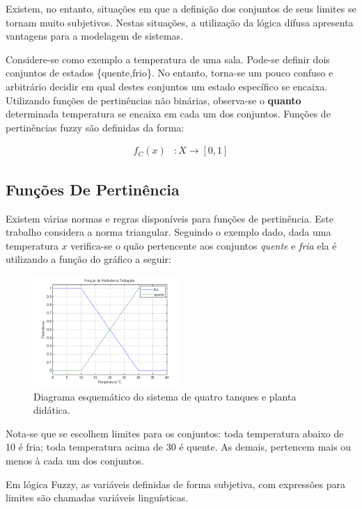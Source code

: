 Existem, no entanto, situações em que a definição dos conjuntos de seus limites se tornam muito subjetivos. Nestas situações, a utilização da lógica difusa apresenta vantagens para a modelagem de sistemas. 

Considere-se como exemplo a temperatura de uma sala. Pode-se definir dois conjuntos de estados \{quente,frio\}. No entanto, torna-se um pouco confuso e arbitrário decidir em qual destes conjuntos um estado específico se encaixa. Utilizando funções de pertinências não binárias, observa-se o \textbf{quanto} determinada temperatura se encaixa em cada um dos conjuntos. Funções de pertinências fuzzy são definidas da forma:

\begin{align*}
	f_{C}(x)&:X \rightarrow [0,1]
\end{align*}

\subsection{Funções De Pertinência}
Existem várias normas e regras disponíveis para funções de pertinência. Este trabalho considera a norma triangular. Seguindo o exemplo dado, dada uma temperatura $x$ verifica-se o quão pertencente aos conjuntos \textit{quente} e \textit{fria} ela é utilizando a função do gráfico a seguir:

\begin{figure}[H]
	\includegraphics[width=0.5\textwidth]{img/pertinencia.png}
	\caption{Diagrama esquemático do sistema de quatro tanques e planta didática.}
	\label{figPertinencia}
\end{figure}

Nota-se que se escolhem limites para os conjuntos: toda temperatura abaixo de 10 é fria; toda temperatura acima de 30 é quente. As demais, pertencem mais ou menos à cada um dos conjuntos.

Em lógica Fuzzy, as variáveis definidas de forma subjetiva, com expressões para limites são chamadas variáveis linguísticas.

